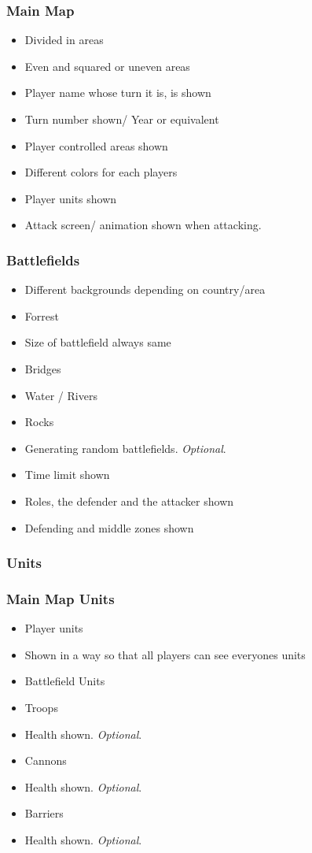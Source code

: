 \documentclass[12pt,a4paper]{article}
\begin{document}
\subsubsection{Main Map}
\begin{itemize}
\item Divided in areas
\item Even and squared or uneven areas
\item Player name whose turn it is, is shown 
\item Turn number shown/ Year or equivalent
\item Player controlled areas shown
\item Different colors for each players
\item Player units shown
\item Attack screen/ animation shown when attacking.
\end{itemize}

\subsubsection{Battlefields}
\begin{itemize}
\item Different backgrounds depending on country/area
\item Forrest
\item Size of battlefield always same
\item Bridges
\item Water / Rivers
\item Rocks
\item Generating random battlefields. \emph{Optional}.
\item Time limit shown
\item Roles, the defender and the attacker shown
\item Defending and middle zones shown
\end{itemize}

\subsubsection{Units}

\subsubsection{Main Map Units}
\begin{itemize}
\item Player units
\item Shown in a way so that all players can see everyones units
\item Battlefield Units
\item Troops
\item Health shown. \emph{Optional}.
\item Cannons
\item Health shown. \emph{Optional}.
\item Barriers
\item Health shown. \emph{Optional}.
\end{itemize}
\end{document}
